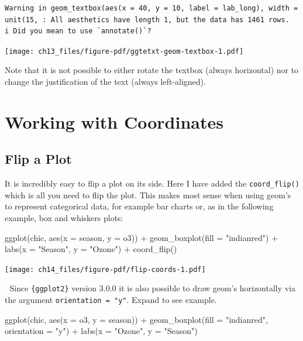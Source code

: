 \documentclass[
  letterpaper,
  DIV=11,
  numbers=noendperiod]{scrreprt}
\newenvironment{Shaded}{\begin{snugshade}}{\end{snugshade}}
\newcommand{\AttributeTok}[1]{\textcolor[rgb]{0.40,0.45,0.13}{#1}}
\newcommand{\FunctionTok}[1]{\textcolor[rgb]{0.28,0.35,0.67}{#1}}
\newcommand{\NormalTok}[1]{\textcolor[rgb]{0.00,0.23,0.31}{#1}}
\newcommand{\SpecialCharTok}[1]{\textcolor[rgb]{0.37,0.37,0.37}{#1}}
\newcommand{\StringTok}[1]{\textcolor[rgb]{0.13,0.47,0.30}{#1}}
\begin{document}
\begin{verbatim}
Warning in geom_textbox(aes(x = 40, y = 10, label = lab_long), width = unit(15, : All aesthetics have length 1, but the data has 1461 rows.
i Did you mean to use `annotate()`?
\end{verbatim}

\texttt{[image: ch13\_files/figure-pdf/ggtetxt-geom-textbox-1.pdf]}

Note that it is not possible to either rotate the textbox (always
horizontal) nor to change the justification of the text (always
left-aligned).


\chapter{Working with Coordinates}\label{coords}

\section{Flip a Plot}\label{flip-a-plot}

It is incredibly easy to flip a plot on its side. Here I have added the
\texttt{coord\_flip()} which is all you need to flip the plot. This
makes most sense when using geom's to represent categorical data, for
example bar charts or, as in the following example, box and whiskers
plots:

\begin{Shaded}
\begin{Highlighting}[]
\FunctionTok{ggplot}\NormalTok{(chic, }\FunctionTok{aes}\NormalTok{(}\AttributeTok{x =}\NormalTok{ season, }\AttributeTok{y =}\NormalTok{ o3)) }\SpecialCharTok{+}
  \FunctionTok{geom\_boxplot}\NormalTok{(}\AttributeTok{fill =} \StringTok{"indianred"}\NormalTok{) }\SpecialCharTok{+}
  \FunctionTok{labs}\NormalTok{(}\AttributeTok{x =} \StringTok{"Season"}\NormalTok{, }\AttributeTok{y =} \StringTok{"Ozone"}\NormalTok{) }\SpecialCharTok{+}
  \FunctionTok{coord\_flip}\NormalTok{()}
\end{Highlighting}
\end{Shaded}

\texttt{[image: ch14\_files/figure-pdf/flip-coords-1.pdf]}

💁 Since \texttt{\{ggplot2\}} version 3.0.0 it is also possible to draw
geom's horizontally via the argument \texttt{orientation\ =\ "y"}.
Expand to see example.

\begin{Shaded}
\begin{Highlighting}[]
\FunctionTok{ggplot}\NormalTok{(chic, }\FunctionTok{aes}\NormalTok{(}\AttributeTok{x =}\NormalTok{ o3, }\AttributeTok{y =}\NormalTok{ season)) }\SpecialCharTok{+}
  \FunctionTok{geom\_boxplot}\NormalTok{(}\AttributeTok{fill =} \StringTok{"indianred"}\NormalTok{, }\AttributeTok{orientation =} \StringTok{"y"}\NormalTok{) }\SpecialCharTok{+}
  \FunctionTok{labs}\NormalTok{(}\AttributeTok{x =} \StringTok{"Ozone"}\NormalTok{, }\AttributeTok{y =} \StringTok{"Season"}\NormalTok{)}
\end{Highlighting}
\end{Shaded}
\end{document}
